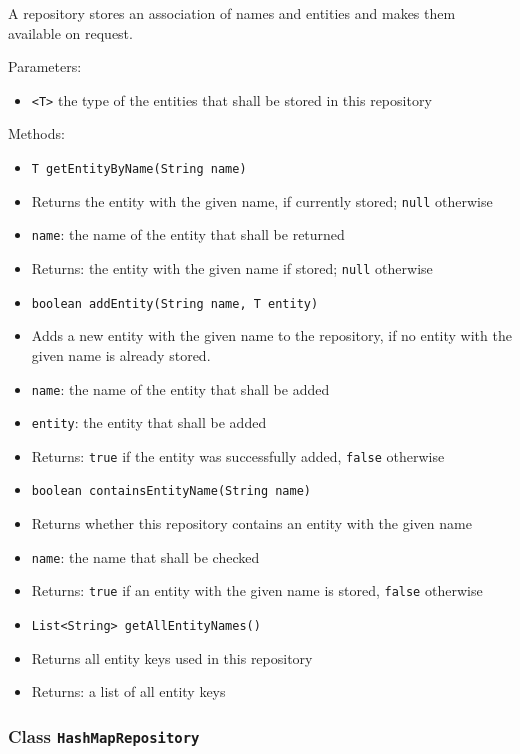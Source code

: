 \documentclass[parskip=full,11pt]{scrartcl}
\begin{document}
A repository stores an association of names and entities and makes them available on request.

Parameters:
\begin{itemize}\itemsep -10pt
	\item \texttt{<T>} the type of the entities that shall be stored in this repository
\end{itemize}


Methods:
\begin{itemize}\itemsep -10pt
	\item \texttt{T getEntityByName(String name)}
	\item[] Returns the entity with the given name, if currently stored; \texttt{null} otherwise
	\item[] \texttt{name}: the name of the entity that shall be returned
	\item[] Returns: the entity with the given name if stored; \texttt{null} otherwise

	\item \texttt{boolean addEntity(String name, T entity)}
	\item[] Adds a new entity with the given name to the repository, if no entity with the given name is already stored.
	\item[] \texttt{name}: the name of the entity that shall be added
	\item[] \texttt{entity}: the entity that shall be added
	\item[] Returns: \texttt{true} if the entity was successfully added, \texttt{false} otherwise

	\item \texttt{boolean containsEntityName(String name)}
	\item[] Returns whether this repository contains an entity with the given name
	\item[] \texttt{name}: the name that shall be checked
	\item[] Returns: \texttt{true} if an entity with the given name is stored, \texttt{false} otherwise

	\item \texttt{List<String> getAllEntityNames()}
	\item[] Returns all entity keys used in this repository
	\item[] Returns: a list of all entity keys

\end{itemize}

\subsubsection{Class \texttt{HashMapRepository}}
\end{document}
